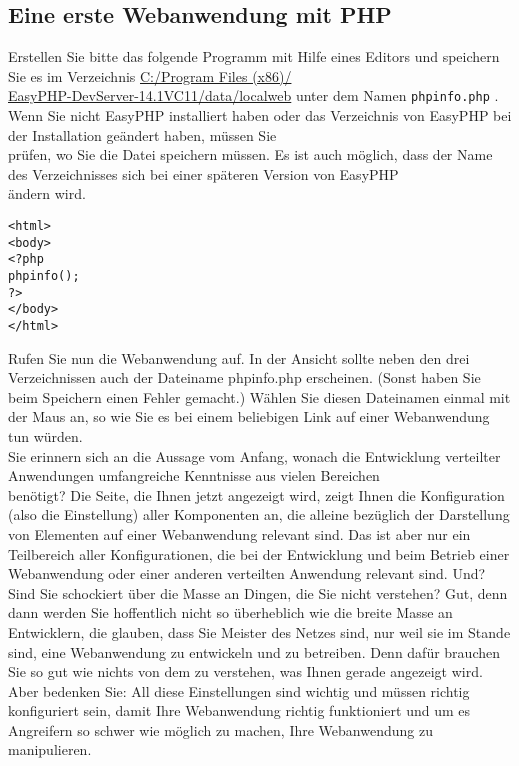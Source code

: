 \subsection{Eine erste Webanwendung mit PHP}

Erstellen Sie bitte das folgende Programm mit Hilfe eines Editors und speichern Sie es im Verzeichnis \url{C:/Program Files (x86)/} \\ \url{EasyPHP-DevServer-14.1VC11/data/localweb} unter dem Namen \verb|phpinfo.php| . Wenn Sie nicht EasyPHP installiert haben oder das Verzeichnis von EasyPHP bei der Installation geändert haben, müssen Sie\\ prüfen, wo Sie die Datei speichern müssen. Es ist auch möglich, dass der Name des Verzeichnisses sich bei einer späteren Version von EasyPHP \\ändern wird.\\

\begin{verbatim}
<html>
<body>
<?php
phpinfo();
?>
</body>
</html>
\end{verbatim}

Rufen Sie nun die Webanwendung auf. In der Ansicht sollte neben den drei Verzeichnissen auch der Dateiname phpinfo.php erscheinen. (Sonst haben Sie beim Speichern einen Fehler gemacht.) Wählen Sie diesen Dateinamen einmal mit der Maus an, so wie Sie es bei einem beliebigen Link auf einer Webanwendung tun würden.\\

Sie erinnern sich an die Aussage vom Anfang, wonach die Entwicklung verteilter Anwendungen umfangreiche Kenntnisse aus vielen Bereichen\\ benötigt? Die Seite, die Ihnen jetzt angezeigt wird, zeigt Ihnen die Konfiguration (also die Einstellung) aller Komponenten an, die alleine bezüglich der Darstellung von Elementen auf einer Webanwendung relevant sind. Das ist aber nur ein Teilbereich aller Konfigurationen, die bei der Entwicklung und beim Betrieb einer Webanwendung oder einer anderen verteilten Anwendung relevant sind. Und? Sind Sie schockiert über die Masse an Dingen, die Sie nicht verstehen? Gut, denn dann werden Sie hoffentlich nicht so überheblich wie die breite Masse an Entwicklern, die glauben, dass Sie Meister des Netzes sind, nur weil sie im Stande sind, eine Webanwendung zu entwickeln und zu betreiben. Denn dafür brauchen Sie so gut wie nichts von dem zu verstehen, was Ihnen gerade angezeigt wird. Aber bedenken Sie: All diese Einstellungen sind wichtig und müssen richtig konfiguriert sein, damit Ihre Webanwendung richtig funktioniert und um es Angreifern so schwer wie möglich zu machen, Ihre Webanwendung zu manipulieren.\\

